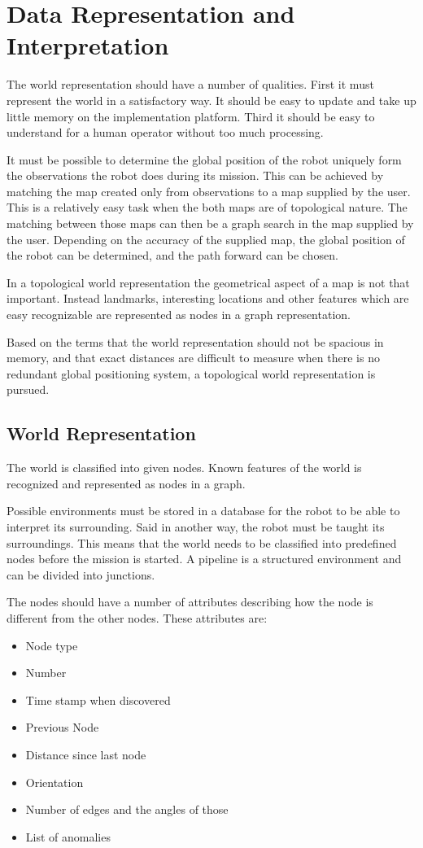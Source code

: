 

\chapter{Data Representation and Interpretation}
\label{chap5}
The world representation should have a number of qualities. First it must represent the
world in a satisfactory way. It should be easy to update and take up little memory on the
implementation platform. Third it should be easy to understand for a human operator
without too much processing. 

It must be possible to determine the global position of the robot uniquely form the
observations the robot does during its mission. This can be achieved by matching the map
created only from observations to a map supplied by the user. This is a relatively easy
task when the both maps are of topological nature. The matching between those maps can
then be a graph search in the map supplied by the user. Depending on the accuracy of the
supplied map, the global position of the robot can be determined, and the path forward can
be chosen. 

In a topological world representation the geometrical aspect of a map is not that
important. Instead landmarks, interesting locations and other features which are easy 
recognizable are represented as nodes in a graph representation. 

Based on the terms that the world representation should not be spacious in memory, and
that exact distances are difficult to measure when there is no redundant global positioning
system, a topological world representation is pursued. 


\section{World Representation}
The world is classified into given nodes. Known features of the world is recognized
and represented as nodes in a graph. 

Possible environments must be stored in a database for the robot to be able to interpret
its surrounding. Said in another way, the robot must be taught its surroundings. 
This means that the world needs to be classified into predefined nodes before the mission
is started. A pipeline is a structured environment and can be divided into junctions. 

The nodes should have a number of attributes describing how the node is different from the
other nodes. These attributes are:
\begin{itemize}
    \item Node type
    \item Number
    \item Time stamp when discovered
    \item Previous Node
    \item Distance since last node
    \item Orientation
    \item Number of edges and the angles of those
    \item List of anomalies
\end{itemize}

